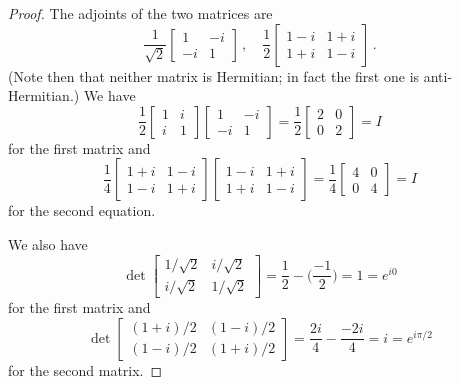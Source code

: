 \begin{proof}
The adjoints of the two matrices are
\begin{equation}
    \frac{1}{\sqrt{2}}
    \begin{bmatrix}
    1 & -i \\
    -i & 1
    \end{bmatrix}\,,
    \quad
    \frac{1}{2}
    \begin{bmatrix}
    1 - i & 1 + i \\
    1 + i & 1 - i
    \end{bmatrix}\,.
\end{equation}
(Note then that neither matrix is Hermitian; in fact the first one is anti-Hermitian.) We have
\begin{equation}
    \frac{1}{2}
    \begin{bmatrix}
    1 & i \\
    i & 1
    \end{bmatrix}
     \begin{bmatrix}
    1 & -i \\
    -i & 1
    \end{bmatrix}
    = \frac{1}{2}
    \begin{bmatrix}
    2 & 0 \\
    0 & 2
    \end{bmatrix}
    = I
\end{equation}
for the first matrix and
\begin{equation}
    \frac{1}{4}
    \begin{bmatrix}
    1 + i & 1 - i \\
    1 - i & 1 + i
    \end{bmatrix}
    \begin{bmatrix}
    1 - i & 1 + i \\
    1 + i & 1 - i
    \end{bmatrix}
    = \frac{1}{4}
    \begin{bmatrix}
    4 & 0 \\
    0 & 4
    \end{bmatrix}
    = I
\end{equation}
for the second equation.

We also have 
\begin{equation}
    \det
    \begin{bmatrix}
    1/\sqrt2 & i/\sqrt2 \\
    i/\sqrt2 & 1/\sqrt2
    \end{bmatrix}
    = \frac{1}{2} - \bigg(\frac{-1}{2}\bigg) = 1 = e^{i0}
\end{equation}
for the first matrix and
\begin{equation}
    \det 
    \begin{bmatrix}
    (1 + i)/2 & (1 - i)/2 \\
    (1 - i)/2 & (1 + i)/2
    \end{bmatrix}
    = \frac{2i}{4} - \frac{-2i}{4} = i = e^{i\pi / 2}
\end{equation}
for the second matrix.
\end{proof}

